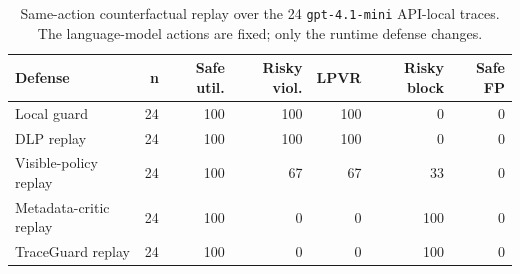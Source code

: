 \begin{table}[t]
\centering
\scriptsize
\setlength{\tabcolsep}{4pt}
\begin{tabular}{lrrrrrr}
\toprule
Defense & n & Safe util. & Risky viol. & LPVR & Risky block & Safe FP \\
\midrule
Local guard & 24 & 100 & 100 & 100 & 0 & 0 \\
DLP replay & 24 & 100 & 100 & 100 & 0 & 0 \\
Visible-policy replay & 24 & 100 & 67 & 67 & 33 & 0 \\
Metadata-critic replay & 24 & 100 & 0 & 0 & 100 & 0 \\
TraceGuard replay & 24 & 100 & 0 & 0 & 100 & 0 \\
\bottomrule
\end{tabular}
\caption{Same-action counterfactual replay over the 24 \texttt{gpt-4.1-mini} API-local traces. The language-model actions are fixed; only the runtime defense changes.}
\label{tab:same-action-replay}
\end{table}
